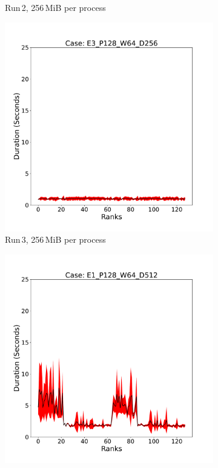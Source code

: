 \begin{figure}
\begin{subfigure}[b]{0.3\textwidth}
         \caption{Run\,2, 256\,MiB per process}
         \label{fig:E2_256_d11}
     \end{subfigure}
      \hfill
     \begin{subfigure}[b]{0.3\textwidth}
         \centering
         \includegraphics[width=\textwidth, height=\textwidth]{figures/deisa1__E3_P128_W64_D256.pdf}
         \caption{Run\,3, 256\,MiB per process}
         \label{fig:E3_256_d11}
     \end{subfigure}
     \vfill
          \begin{subfigure}[b]{0.3\textwidth}
         \centering
         \includegraphics[width=\textwidth, height=\textwidth]{figures/deisa1__E1_P128_W64_D512.pdf}

\end{subfigure}
\end{figure}
